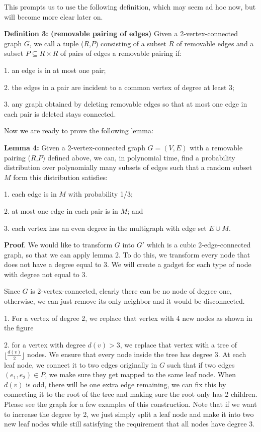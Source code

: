 \documentclass[12pt]{article}
\begin{document}
This prompts us to use the following definition, which may seem ad hoc now, but will become more clear later on.

{\bf Definition 3: (removable pairing of edges)}
Given a 2-vertex-connected graph $G$, we call a tuple ($R$,$P$) consisting of a subset $R$ of removable edges and a subset $P \subseteq R \times R$ of pairs of edges a removable pairing if:

1. an edge is in at most one pair;

2. the edges in a pair are incident to a common vertex of degree at least 3;

3. any graph obtained by deleting removable edges so that at most one edge in each pair is deleted stays connected.

Now we are ready to prove the following lemma:

{\bf Lemma 4:} Given a 2-vertex-connected graph $G=(V,E)$ with a removable pairing ($R$,$P$) defined above, we can, in polynomial time, find a probability distribution over polynomially many subsets of edges such that a random subset $M$ form this distribution satisfies:

1. each edge is in $M$ with probability 1/3;

2. at most one edge in each pair is in $M$; and

3. each vertex has an even degree in the multigraph with edge set $E \cup M$.

{\bf Proof}. We would like to transform $G$ into $G'$ which is a cubic 2-edge-connected graph, so that we can apply lemma 2. To do this, we transform every node that does not have a degree equal to 3. We will create a gadget for each type of node with degree not equal to 3.

Since $G$ is 2-vertex-connected, clearly there can be no node of degree one, otherwise, we can just remove its only neighbor and it would be disconnected.

1. For a vertex of degree 2, we replace that vertex with 4 new nodes as shown in the figure

2. for a vertex with degree $d(v)>3$, we replace that vertex with a tree of $\lfloor \frac{d(v)}{2} \rfloor$ nodes. We ensure that every node inside the tree has degree 3. At each leaf node, we connect it to two edges originally in $G$ such that if two edges $(e_1,e_2)\in P$, we make sure they get mapped to the same leaf node. When $d(v)$ is odd, there will be one extra edge remaining, we can fix this by connecting it to the root of the tree and making sure the root only has 2 children. Please see the graph for a few examples of this construction. Note that if we want to increase the degree by 2, we just simply split a leaf node and make it into two new leaf nodes while still satisfying the requirement that all nodes have degree 3.
\end{document}
